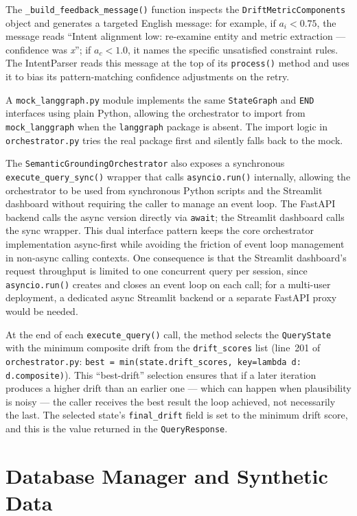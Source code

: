 \documentclass[12pt,a4paper]{report}
\begin{document}
The \texttt{\_build\_feedback\_message()} function inspects the \texttt{DriftMetricComponents} object and generates a targeted English message: for example, if $a_i < 0.75$, the message reads ``Intent alignment low: re-examine entity and metric extraction — confidence was \textit{x}''; if $a_c < 1.0$, it names the specific unsatisfied constraint rules. The IntentParser reads this message at the top of its \texttt{process()} method and uses it to bias its pattern-matching confidence adjustments on the retry.

A \texttt{mock\_langgraph.py} module implements the same \texttt{StateGraph} and \texttt{END} interfaces using plain Python, allowing the orchestrator to import from \texttt{mock\_langgraph} when the \texttt{langgraph} package is absent. The import logic in \texttt{orchestrator.py} tries the real package first and silently falls back to the mock.

The \texttt{SemanticGroundingOrchestrator} also exposes a synchronous \texttt{execute\_query\_sync()} wrapper that calls \texttt{asyncio.run()} internally, allowing the orchestrator to be used from synchronous Python scripts and the Streamlit dashboard without requiring the caller to manage an event loop. The FastAPI backend calls the async version directly via \texttt{await}; the Streamlit dashboard calls the sync wrapper. This dual interface pattern keeps the core orchestrator implementation async-first while avoiding the friction of event loop management in non-async calling contexts. One consequence is that the Streamlit dashboard's request throughput is limited to one concurrent query per session, since \texttt{asyncio.run()} creates and closes an event loop on each call; for a multi-user deployment, a dedicated async Streamlit backend or a separate FastAPI proxy would be needed.

At the end of each \texttt{execute\_query()} call, the method selects the \texttt{QueryState} with the minimum composite drift from the \texttt{drift\_scores} list (line~201 of \texttt{orchestrator.py}: \texttt{best = min(state.drift\_scores, key=lambda d: d.composite)}). This ``best-drift'' selection ensures that if a later iteration produces a higher drift than an earlier one — which can happen when plausibility is noisy — the caller receives the best result the loop achieved, not necessarily the last. The selected state's \texttt{final\_drift} field is set to the minimum drift score, and this is the value returned in the \texttt{QueryResponse}.

\section{Database Manager and Synthetic Data}
\label{sec:db-impl}
\end{document}
